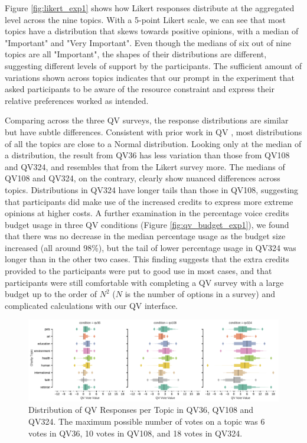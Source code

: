 Figure \ref{fig:likert_exp1} shows how Likert responses distribute at the aggregated level across the nine topics. With a 5-point Likert scale, we can see that most topics have a distribution that skews towards positive opinions, with a median of "Important" and "Very Important". Even though the medians of six out of nine topics are all "Important", the shapes of their distributions are different, suggesting different levels of support by the participants. The sufficient amount of variations shown across topics indicates that our prompt in the experiment that asked participants to be aware of the resource constraint and express their relative preferences worked as intended. 

Comparing across the three QV surveys, the response distributions are similar but have subtle differences. Consistent with prior work in QV \cite{quarfoot2017quadratic}, most distributions of all the topics are close to a Normal distribution. Looking only at the median of a distribution, the result from QV36 has less variation than those from QV108 and QV324, and resembles that from the Likert survey more. The medians of QV108 and QV324, on the contrary, clearly show nuanced differences across topics. Distributions in QV324 have longer tails than those in QV108, suggesting that participants did make use of the increased credits to express more extreme opinions at higher costs. A further examination in the percentage voice credits budget usage in three QV conditions (Figure \ref{fig:qv_budget_exp1}), we found that there was no decrease in the median percentage usage as the budget size increased (all around 98\%), but the tail of lower percentage usage in QV324 was longer than in the other two cases. This finding suggests that the extra credits provided to the participants were put to good use in most cases, and that participants were still comfortable with completing a QV survey with a large budget up to the order of $N^2$ ($N$ is the number of options in a survey) and complicated calculations with our QV interface. %

\begin{figure}[htpb]
    \centering
    \includegraphics[width=\textwidth, keepaspectratio=true]{content/image/qv_distribution_per_topic.pdf}
    \caption{
      Distribution of QV Responses per Topic in QV36, QV108 and QV324. The maximum possible number of votes on a topic was 6 votes in QV36, 10 votes in QV108, and 18 votes in QV324.
    }
    \label{fig:qv3_exp1}
\end{figure}


